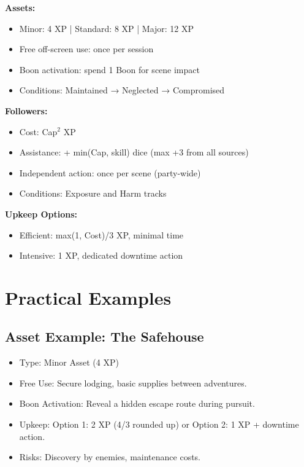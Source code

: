 \documentclass[11pt,twoside,openany]{book}
\begin{document}
\begin{tcolorbox}[colback=gray!5!white, colframe=gray!75!black, title=Assets and Followers Quick Reference, fonttitle=\bfseries]
\textbf{Assets:}
\begin{itemize}
\item Minor: 4 XP | Standard: 8 XP | Major: 12 XP
\item Free off-screen use: once per session
\item Boon activation: spend 1 Boon for scene impact
\item Conditions: Maintained → Neglected → Compromised
\end{itemize}

\textbf{Followers:}
\begin{itemize}
\item Cost: Cap$^2$ XP
\item Assistance: + min(Cap, skill) dice (max +3 from all sources)
\item Independent action: once per scene (party-wide)
\item Conditions: Exposure and Harm tracks
\end{itemize}

\textbf{Upkeep Options:}
\begin{itemize}
\item Efficient: max(1, Cost)/3 XP, minimal time
\item Intensive: 1 XP, dedicated downtime action
\end{itemize}
\end{tcolorbox}

\section*{Practical Examples} 

\subsection*{Asset Example: The Safehouse}

\begin{itemize}
\item Type: Minor Asset (4 XP)
\item Free Use: Secure lodging, basic supplies between adventures.
\item Boon Activation: Reveal a hidden escape route during pursuit.
\item Upkeep: Option 1: 2 XP (4/3 rounded up) or Option 2: 1 XP + downtime action.
\item Risks: Discovery by enemies, maintenance costs.
\end{itemize}
\end{document}
